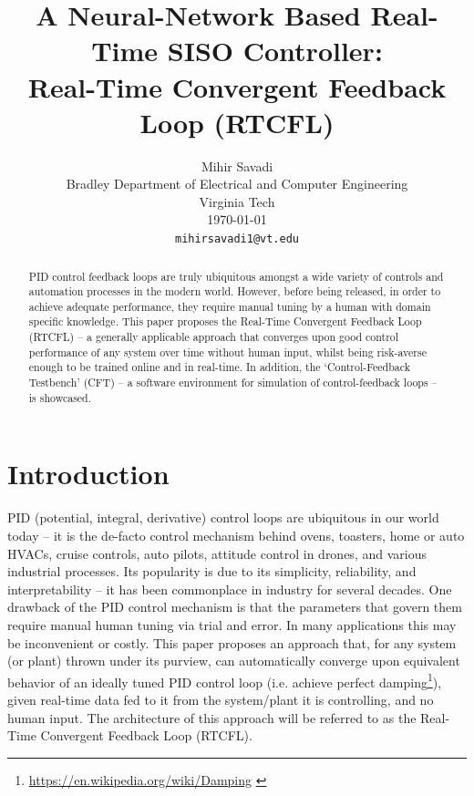 \documentclass[10pt,twocolumn,letterpaper]{article}
\begin{document}
    \title{A Neural-Network Based Real-Time SISO Controller:\\Real-Time Convergent Feedback Loop (RTCFL)}

    \author{Mihir Savadi\\
    Bradley Department of Electrical and Computer Engineering\\
    Virginia Tech\\ \today\\
    {\tt\small mihirsavadi1@vt.edu} }

    \maketitle
    \thispagestyle{empty}

    \begin{abstract} 
        PID control feedback loops are truly ubiquitous amongst a wide variety of controls and automation processes in
        the modern world. However, before being released, in order to achieve adequate performance, they require manual
        tuning by a human with domain specific knowledge. This paper proposes the Real-Time Convergent Feedback Loop
        (RTCFL) -- a generally applicable approach that converges upon good control performance of any system over time
        without human input, whilst being risk-averse enough to be trained online and in real-time. In addition, the
        `Control-Feedback Testbench' (CFT) -- a software environment for simulation of control-feedback loops -- is
        showcased.
    \end{abstract}
    \tableofcontents

    \section{Introduction} \label{intro}

        PID (potential, integral, derivative) control loops are ubiquitous in our world today -- it is the de-facto
        control mechanism behind ovens, toasters, home or auto HVACs, cruise controls, auto pilots, attitude control in
        drones, and various industrial processes. Its popularity is due to its simplicity, reliability, and
        interpretability -- it has been commonplace in industry for several decades. One drawback of the PID control
        mechanism is that the parameters that govern them require manual human tuning via trial and error. In many
        applications this may be inconvenient or costly. This paper proposes an approach that, for any system (or plant)
        thrown under its purview, can automatically converge upon equivalent behavior of an ideally tuned PID control
        loop (i.e. achieve perfect damping\footnote{\url{https://en.wikipedia.org/wiki/Damping} \label{wikidamp}}),
        given real-time data fed to it from the system/plant it is controlling, and no human input. The architecture of
        this approach will be referred to as the Real-Time Convergent Feedback Loop (RTCFL).
\end{document}
